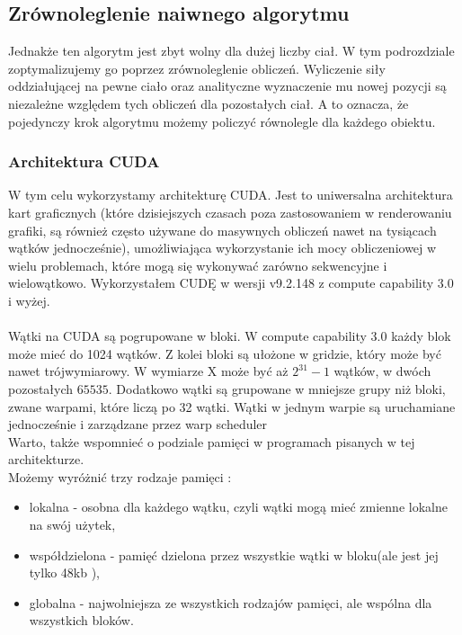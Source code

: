 \documentclass[14pt,twoside,a4paper]{article}
\theoremstyle{definition}
\begin{document}
\bigskip

\subsection{\Large Zrównoleglenie naiwnego algorytmu}

Jednakże ten algorytm jest zbyt wolny dla dużej liczby ciał. W tym podrozdziale zoptymalizujemy go poprzez zrównoleglenie obliczeń. Wyliczenie siły oddziałującej na pewne ciało oraz analityczne wyznaczenie mu nowej pozycji są niezależne względem tych obliczeń dla pozostałych ciał. A to oznacza, że pojedynczy krok algorytmu możemy policzyć równolegle dla każdego obiektu.

\subsubsection{\large Architektura CUDA}
W tym celu wykorzystamy architekturę CUDA. 
Jest to uniwersalna architektura kart graficznych (które dzisiejszych czasach poza zastosowaniem w renderowaniu grafiki, są również często używane do masywnych obliczeń nawet na tysiącach wątków jednocześnie), umożliwiająca wykorzystanie ich mocy obliczeniowej w wielu problemach, które mogą się wykonywać zarówno sekwencyjne i wielowątkowo. Wykorzystałem CUDĘ w wersji v9.2.148 z compute capability 3.0 i wyżej. \\~\\
Wątki na CUDA są pogrupowane w bloki. W compute capability 3.0 każdy blok może mieć do 1024 wątków. Z kolei bloki są ułożone w gridzie, który może być nawet trójwymiarowy. W wymiarze X może być aż $2^{31}-1$ wątków, w dwóch pozostałych $65535$. \cite[str.~238-242]{Cuda} Dodatkowo wątki są grupowane w mniejsze grupy niż bloki, zwane warpami, które liczą po 32 wątki. Wątki w jednym warpie są uruchamiane jednocześnie i zarządzane przez warp scheduler \cite[str.~70]{Cuda} \\
\bigskip
Warto, także wspomnieć o podziale pamięci w programach pisanych w tej architekturze. \\Możemy wyróżnić trzy rodzaje pamięci :
\begin{itemize}
  \item lokalna - osobna dla każdego wątku, czyli wątki mogą mieć zmienne lokalne na swój użytek,
  \item współdzielona - pamięć dzielona przez wszystkie wątki w bloku(ale jest jej tylko 48kb \cite[str.~238-242]{Cuda}),
  \item globalna - najwolniejsza ze wszystkich rodzajów pamięci, ale wspólna dla wszystkich bloków.
\end{itemize}
\end{document}
